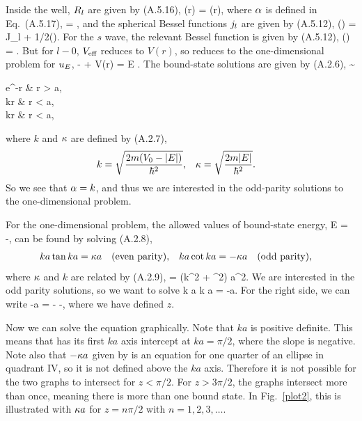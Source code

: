\begin{solution}
	Inside the well, $R_l$ are given by (A.5.16),
	\beq
		\Rl(r) = \constant \jl(\alp r),
	\eeq
	where $\alpha$ is defined in Eq.~(A.5.17),
	\beq
		\alp = ,
	\eeq
	\clearpage
	and the spherical Bessel functions $j_l$ are given by (A.5.12),
	\beq
		\jl(\rho) = \sqrt{\frac{\pi}{2\rho}} J_{l + 1/2}(\rho).
	\eeq
	For the $s$ wave, the relevant Bessel function is given by (A.5.12),
	\beqn \label{jo}
		\jo(\rho) = \frac{\sin\rho}{\rho}.
	\eeqn
	But for $l - 0$, $V_{\text{eff}}$ reduces to $V(r)$, so  reduces to the one-dimensional problem for $u_E$,
	\beq
		-  + V(r) \uE = E \uE.
	\eeq
	The bound-state solutions are given by (A.2.6),
	\beqn \label{sols}
		\uE \sim \begin{cases}
			e^{-\kap r} &  r > a, \\
			\cos kr \quad {} &  r < a, \\
			\sin kr \quad {} & \text{for } r < a,
		\end{cases}
	\eeqn
	where $k$ and $\kappa$ are defined by (A.2.7),
	\begin{align*}
		k &= \sqrt{\frac{2m (V_0 - \abs{E})}{\hbar^2}}, &
		\kappa &= \sqrt{\frac{2m \abs{E}}{\hbar^2}}.
	\end{align*}
	So we see that $\alpha = k$, and thus we are interested in the odd-parity solutions to the one-dimensional problem.
	
	For the one-dimensional problem, the allowed values of bound-state energy,
	\beq
		E = -\frac{\hbar^2 \kap^2}{2m},
	\eeq
	can be found by solving (A.2.8),
	\begin{align*}
		k a \tan k a &= \kappa a \quad\text{(even parity)}, &
		k a \cot k a &= -\kappa a \quad\text{(odd parity)},
	\end{align*}
	where $\kappa$ and $k$ are related by (A.2.9),
	\beq
		 = (k^2 + \kap^2) a^2.
	\eeq
	We are interested in the odd parity solutions, so we want to solve
	\beqn \label{ka}
		k a \cot k a = -\kap a.
	\eeqn
	For the right side, we can write
	\beqn \label{kapa}
		-\kap a = - \equiv -\sqrt{z^2 - (ka)^2},
	\eeqn
	where we have defined $z$.
	
	Now we can solve the equation graphically.  Note that $ka$ is positive definite. This means that  has its first $ka$ axis intercept at $ka = \pi/2$, where the slope is negative.  Note also that $-\kappa a$ given by  is an equation for one quarter of an ellipse in quadrant IV, so it is not defined above the $ka$ axis.  Therefore it is not possible for the two graphs to intersect for $z < \pi / 2$.  For $z > 3\pi / 2$, the graphs intersect more than once, meaning there is more than one bound state.  In Fig.~\ref{plot2}, this is illustrated with $\kappa a$ for $z = n \pi / 2$ with $n = 1, 2, 3, \ldots$.
	

\end{solution}
